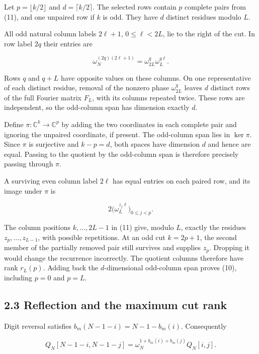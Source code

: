 \documentclass[
  11pt,
  letterpaper,
]{article}
\begin{document}
Let \(p=\lfloor k/2\rfloor\) and \(d=\lceil k/2\rceil\). The selected
rows contain \(p\) complete pairs from (11), and one unpaired row if
\(k\) is odd. They have \(d\) distinct residues modulo \(L\).

All odd natural column labels \(2\ell+1\), \(0\leq\ell<2L\), lie to the
right of the cut. In row label \(2q\) their entries are

\[
\omega_N^{(2q)(2\ell+1)}
=\omega_{2L}^{q}\omega_L^{q\ell}.                           \tag{12}
\]

Rows \(q\) and \(q+L\) have opposite values on these columns. On one
representative of each distinct residue, removal of the nonzero phase
\(\omega_{2L}^q\) leaves \(d\) distinct rows of the full Fourier matrix
\(F_L\), with its columns repeated twice. These rows are independent, so
the odd-column span has dimension exactly \(d\).

Define \(\pi:\mathbb C^k\to\mathbb C^p\) by adding the two coordinates
in each complete pair and ignoring the unpaired coordinate, if present.
The odd-column span lies in \(\ker\pi\). Since \(\pi\) is surjective and
\(k-p=d\), both spaces have dimension \(d\) and hence are equal. Passing
to the quotient by the odd-column span is therefore precisely passing
through \(\pi\).

A surviving even column label \(2\ell\) has equal entries on each paired
row, and its image under \(\pi\) is

\[
2\bigl(\omega_L^{z_j\ell}\bigr)_{0\leq j<p}.                \tag{13}
\]

The column positions \(k,\ldots,2L-1\) in (11) give, modulo \(L\),
exactly the residues \(z_p,\ldots,z_{L-1}\), with possible repetitions.
At an odd cut \(k=2p+1\), the second member of the partially removed
pair still survives and supplies \(z_p\). Dropping it would change the
recurrence incorrectly. The quotient columns therefore have rank
\(r_L(p)\). Adding back the \(d\)-dimensional odd-column span proves
(10), including \(p=0\) and \(p=L\).

\subsection{2.3 Reflection and the maximum cut
rank}\label{reflection-and-the-maximum-cut-rank}

Digit reversal satisfies \(b_m(N-1-i)=N-1-b_m(i)\). Consequently

\[
Q_N[N-1-i,N-1-j]
=\omega_N^{1+b_m(i)+b_m(j)}Q_N[i,j].                       \tag{14}
\]
\end{document}
